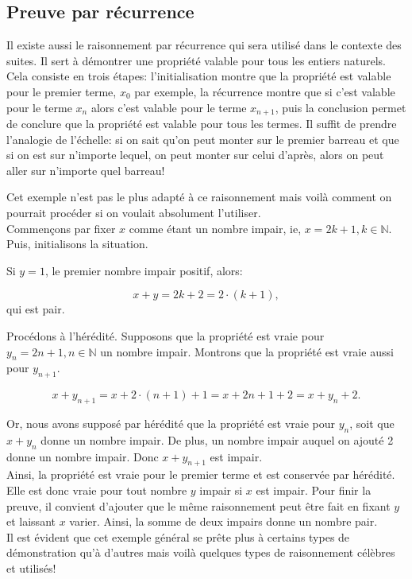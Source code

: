 \documentclass[oneside,12pt,french,table]{book}
\theoremstyle{definition}
\theoremstyle{plain}
\theoremstyle{remark}
\newcommand{\Nn}{{\mathbb{N}}}
\begin{document}
\subsection{Preuve par récurrence}
Il existe aussi le raisonnement par récurrence qui sera utilisé dans le contexte des suites. Il sert à démontrer une propriété valable pour tous les entiers naturels. Cela consiste en trois étapes: l'initialisation montre que la propriété est valable pour le premier terme, $x_0$ par exemple, la récurrence montre que si c'est valable pour le terme $x_n$ alors c'est valable pour le terme $x_{n+1}$, puis la conclusion permet de conclure que la propriété est valable pour tous les termes. Il suffit de prendre l'analogie de l'échelle: si on sait qu'on peut monter sur le premier barreau et que si on est sur n'importe lequel, on peut monter sur celui d'après, alors on peut aller sur n'importe quel barreau! 

Cet exemple n'est pas le plus adapté à ce raisonnement mais voilà comment on pourrait procéder si on voulait absolument l'utiliser.\\

Commençons par fixer $x$ comme étant un nombre impair, ie, $x=2k+1, k\in \Nn$. Puis, initialisons la situation.

Si $y=1$, le premier nombre impair positif, alors:

\begin{equation}
    x+y=2k+2=2\cdot(k+1),
\end{equation}
qui est pair.

Procédons à l'hérédité. Supposons que la propriété est vraie pour $y_n=2n+1, n\in \Nn$ un nombre impair. Montrons que la propriété est vraie aussi pour $y_{n+1}$.

\begin{equation}
    x+y_{n+1}=x+2\cdot(n+1)+1=x+2n+1+2=x+y_n +2.
\end{equation}

Or, nous avons supposé par hérédité que la propriété est vraie pour $y_n$, soit que $x+y_n$ donne un nombre impair. De plus, un nombre impair auquel on ajouté 2 donne un nombre impair. Donc $x+y_{n+1}$ est impair. \\

Ainsi, la propriété est vraie pour le premier terme et est conservée par hérédité. Elle est donc vraie pour tout nombre $y$ impair si $x$ est impair. Pour finir la preuve, il convient d'ajouter que le même raisonnement peut être fait en fixant $y$ et laissant $x$ varier. Ainsi, la somme de deux impairs donne un nombre pair. \\
Il est évident que cet exemple général se prête plus à certains types de démonstration qu'à d'autres mais voilà quelques types de raisonnement célèbres et utilisés! 
\end{document}
